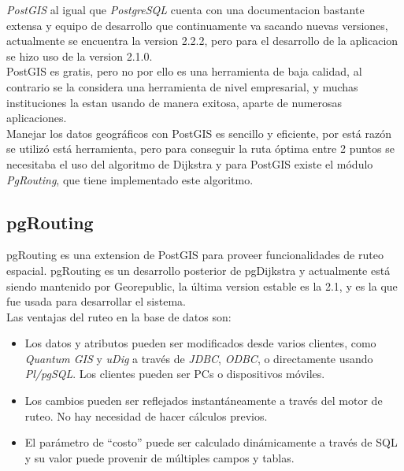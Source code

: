       \emph{PostGIS} al igual que \emph{PostgreSQL} cuenta con una documentacion bastante extensa y equipo de desarrollo que continuamente va sacando nuevas versiones, actualmente se encuentra la version 2.2.2, pero para el desarrollo de la aplicacion se hizo uso de la version 2.1.0.\\

      PostGIS es gratis, pero no por ello es una herramienta de baja calidad, al contrario se la considera una herramienta de nivel empresarial, y muchas instituciones la estan usando de manera exitosa, aparte de numerosas aplicaciones.\\

      Manejar los datos geográficos con PostGIS es sencillo y eficiente, por está raz\'on se utilizó está herramienta, pero para conseguir la ruta óptima entre 2 puntos se necesitaba el uso del algoritmo de Dijkstra y para PostGIS existe el módulo \emph{PgRouting}, que tiene implementado este algoritmo.\\

      \subsection{pgRouting} %
      \label{sec:pgrouting}
        pgRouting es una extension  de  PostGIS para proveer funcionalidades de ruteo espacial. pgRouting es un desarrollo posterior de pgDijkstra y actualmente está siendo mantenido por Georepublic, la última version estable es la 2.1, y es la que fue usada para desarrollar el sistema.\\

        Las ventajas del ruteo en la base de datos son:
        \begin{itemize}
          \item Los datos y atributos pueden ser modificados desde varios clientes, como \emph{Quantum GIS} y \emph{uDig} a través de \emph{JDBC}, \emph{ODBC}, o directamente usando \emph{Pl/pgSQL}. Los clientes pueden ser PCs o dispositivos móviles.
          \item Los cambios pueden ser reflejados instantáneamente a través del motor de ruteo. No hay necesidad de hacer cálculos previos.
          \item El parámetro de ``costo'' puede ser calculado dinámicamente a través de SQL y su valor puede provenir de múltiples campos y tablas.
        \end{itemize}

